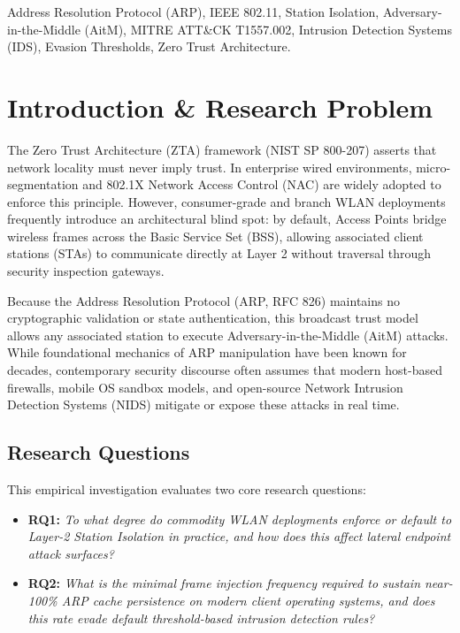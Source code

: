 \documentclass[conference]{IEEEtran}
\begin{document}
\begin{IEEEkeywords}
Address Resolution Protocol (ARP), IEEE 802.11, Station Isolation, Adversary-in-the-Middle (AitM), MITRE ATT\&CK T1557.002, Intrusion Detection Systems (IDS), Evasion Thresholds, Zero Trust Architecture.
\end{IEEEkeywords}

\section{Introduction \& Research Problem}
The Zero Trust Architecture (ZTA) framework (NIST SP 800-207) asserts that network locality must never imply trust. In enterprise wired environments, micro-segmentation and 802.1X Network Access Control (NAC) are widely adopted to enforce this principle. However, consumer-grade and branch WLAN deployments frequently introduce an architectural blind spot: by default, Access Points bridge wireless frames across the Basic Service Set (BSS), allowing associated client stations (STAs) to communicate directly at Layer 2 without traversal through security inspection gateways.

Because the Address Resolution Protocol (ARP, RFC 826) maintains no cryptographic validation or state authentication, this broadcast trust model allows any associated station to execute Adversary-in-the-Middle (AitM) attacks. While foundational mechanics of ARP manipulation have been known for decades, contemporary security discourse often assumes that modern host-based firewalls, mobile OS sandbox models, and open-source Network Intrusion Detection Systems (NIDS) mitigate or expose these attacks in real time.

\subsection{Research Questions}
This empirical investigation evaluates two core research questions:
\begin{itemize}
    \item \textbf{RQ1:} \textit{To what degree do commodity WLAN deployments enforce or default to Layer-2 Station Isolation in practice, and how does this affect lateral endpoint attack surfaces?}
    \item \textbf{RQ2:} \textit{What is the minimal frame injection frequency required to sustain near-100\% ARP cache persistence on modern client operating systems, and does this rate evade default threshold-based intrusion detection rules?}
\end{itemize}
\end{document}
